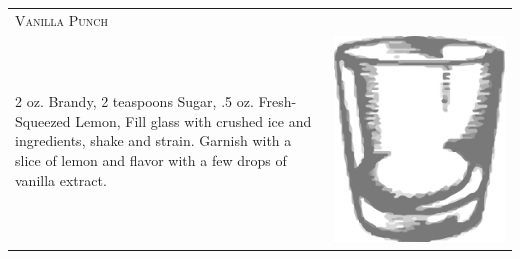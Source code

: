 \documentclass{article}
\begin{document}
\begin{tabular}{p{2in} p{0.5in}}
  \multicolumn{2}{p{3in}}{\centering\Huge\textsc{Vanilla Punch}} \\ 
  
   \vspace{-0.1in}2 oz. Brandy, 2 teaspoons Sugar, .5 oz. Fresh-Squeezed
    Lemon, Fill glass with crushed ice and ingredients, shake and
    strain. Garnish with a slice of lemon and flavor with a few drops
    of vanilla extract. &  \vspace{-0.1in} \includegraphics{rocks_glass.png}
\end{tabular}
\end{document}
